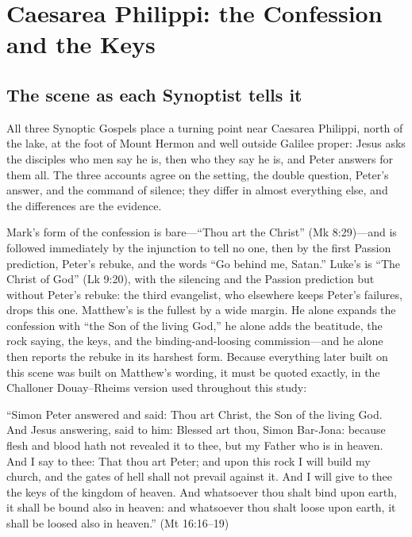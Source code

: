 \section{Caesarea Philippi: the Confession and the Keys}

\subsection{The scene as each Synoptist tells it}

All three Synoptic Gospels place a turning point near Caesarea Philippi,
north of the lake, at the foot of Mount Hermon and well outside Galilee
proper: Jesus asks the disciples who men say he is, then who they say he is,
and Peter answers for them all. The three accounts agree on the setting, the
double question, Peter's answer, and the command of silence; they differ in
almost everything else, and the differences are the evidence.

Mark's form of the confession is bare---``Thou art the Christ''
(Mk 8:29)---and is followed immediately by the injunction to tell no one,
then by the
first Passion prediction, Peter's rebuke, and the words ``Go behind me,
Satan.'' Luke's is ``The Christ of God'' (Lk 9:20), with the silencing and
the Passion prediction but without Peter's rebuke: the third evangelist,
who elsewhere keeps Peter's failures, drops this one. Matthew's is the
fullest by a wide margin. He alone expands the confession with ``the Son of
the living God,'' he alone adds the beatitude, the rock saying, the keys, and
the binding-and-loosing commission---and he alone then reports the rebuke in
its harshest form. Because everything later built on this scene was built on
Matthew's wording, it must be quoted exactly, in the Challoner
Douay--Rheims version used throughout this study:

\begin{studyframe}\small
``Simon Peter answered and said: Thou art Christ, the Son of the living God.
And Jesus answering, said to him: Blessed art thou, Simon Bar-Jona: because
flesh and blood hath not revealed it to thee, but my Father who is in
heaven. And I say to thee: That thou art Peter; and upon this rock I will
build my church, and the gates of hell shall not prevail against it. And I
will give to thee the keys of the kingdom of heaven. And whatsoever thou
shalt bind upon earth, it shall be bound also in heaven: and whatsoever thou
shalt loose upon earth, it shall be loosed also in heaven.'' (Mt 16:16--19)
\end{studyframe}

